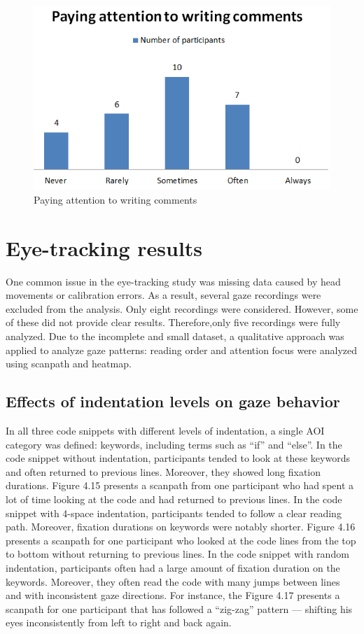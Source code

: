 \begin{figure} [H]
  \centering
  \includegraphics[scale=0.8]{figures/comAt.png}
  \caption{Paying attention to writing comments }
  \label{fig:AnhangsChor}
\end{figure}

\section{Eye-tracking results}
One common issue in the eye-tracking study was missing data caused by head movements or calibration errors. As a result, several gaze recordings were excluded from the analysis. Only eight recordings were considered. However, some of these did not provide clear results. Therefore,only five recordings were fully analyzed. 
Due to the incomplete and small dataset, a qualitative approach was applied to analyze gaze patterns: reading order and attention focus were analyzed using scanpath and heatmap.  
 


\subsection{Effects of indentation levels on gaze behavior}
In all three code snippets with different levels of indentation, a single AOI category was defined: keywords, including terms such as “if” and “else”. In the code snippet without indentation, participants tended to look at these keywords and often returned to previous lines. Moreover, they showed long fixation durations.  Figure 4.15 presents a scanpath from one participant who had spent a lot of time looking at the code and had returned to previous lines. In the code snippet with 4-space indentation, participants tended to follow a clear reading path. Moreover, fixation durations on keywords were notably shorter. Figure 4.16 presents a scanpath for one participant who looked at the code lines from the top to bottom without returning to previous lines.  
In the code snippet with random indentation, participants often had a large amount of fixation duration on the keywords.  Moreover, they often read the code with many jumps between lines and with inconsistent gaze directions. For instance, the Figure 4.17 presents a scanpath for one participant that has followed a “zig-zag” pattern — shifting his eyes inconsistently from left to right and back again.  



